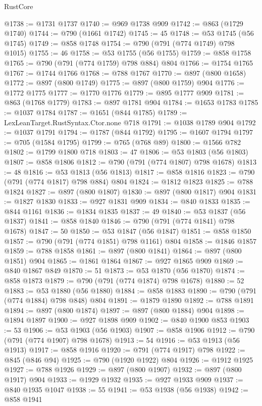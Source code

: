 \begin{lexlean}{RustCore}
\begin{coremodule}
@1738 := @1731 @1737
@1740 := @969 @1738 @909
@1742 := @863 (@1729 @1740)
@1744 := @790 (@1661 @1742)
@1745 := 45
@1748 := @53 @1745 (@56 @1745)
@1749 := @858 @1748
@1754 := @790 (@791 (@774 @1749) @798 @1015)
@1755 := 46
@1758 := @53 @1755 (@56 @1755)
@1759 := @858 @1758
@1765 := @790 (@791 (@774 @1759) @798 @884) @804
@1766 := @1754 @1765
@1767 := @1744 @1766
@1768 := @788 @1767
@1770 := @897 (@800 @1658)
@1772 := @897 (@800 @1749)
@1775 := @897 (@800 @1759) @904
@1776 := @1772 @1775
@1777 := @1770 @1776
@1779 := @895 @1777 @909
@1781 := @863 (@1768 @1779)
@1783 := @897 @1781 @904
@1784 := @1653 @1783
@1785 := @1037 @1784
@1787 := @1651 (@844 @1785)
@1789 := LexLeanTarget.RustSyntax.Ctor.none @718
@1791 := @1038 @1789 @904
@1792 := @1037 @1791
@1794 := @1787 (@844 @1792)
@1795 := @1607 @1794
@1797 := @705 (@1584 @1795)
@1799 := @765 (@768 @89)
@1800 := @1566 @782
@1802 := @1799 @1800 @718
@1803 := 47
@1806 := @53 @1803 (@56 @1803)
@1807 := @858 @1806
@1812 := @790 (@791 (@774 @1807) @798 @1678)
@1813 := 48
@1816 := @53 @1813 (@56 @1813)
@1817 := @858 @1816
@1823 := @790 (@791 (@774 @1817) @798 @884) @804
@1824 := @1812 @1823
@1825 := @788 @1824
@1827 := @897 (@800 @1807)
@1830 := @897 (@800 @1817) @904
@1831 := @1827 @1830
@1833 := @927 @1831 @909
@1834 := @840 @1833
@1835 := @844 @1161
@1836 := @1834 @1835
@1837 := 49
@1840 := @53 @1837 (@56 @1837)
@1841 := @858 @1840
@1846 := @790 (@791 (@774 @1841) @798 @1678)
@1847 := 50
@1850 := @53 @1847 (@56 @1847)
@1851 := @858 @1850
@1857 := @790 (@791 (@774 @1851) @798 @1161) @804
@1858 := @1846 @1857
@1859 := @788 @1858
@1861 := @897 (@800 @1841)
@1864 := @897 (@800 @1851) @904
@1865 := @1861 @1864
@1867 := @927 @1865 @909
@1869 := @840 @1867 @849
@1870 := 51
@1873 := @53 @1870 (@56 @1870)
@1874 := @858 @1873
@1879 := @790 (@791 (@774 @1874) @798 @1678)
@1880 := 52
@1883 := @53 @1880 (@56 @1880)
@1884 := @858 @1883
@1890 := @790 (@791 (@774 @1884) @798 @848) @804
@1891 := @1879 @1890
@1892 := @788 @1891
@1894 := @897 (@800 @1874)
@1897 := @897 (@800 @1884) @904
@1898 := @1894 @1897
@1900 := @927 @1898 @909
@1902 := @840 @1900 @853
@1903 := 53
@1906 := @53 @1903 (@56 @1903)
@1907 := @858 @1906
@1912 := @790 (@791 (@774 @1907) @798 @1678)
@1913 := 54
@1916 := @53 @1913 (@56 @1913)
@1917 := @858 @1916
@1920 := @791 (@774 @1917) @798
@1922 := @845 (@846 @94)
@1925 := @790 (@1920 @1922) @804
@1926 := @1912 @1925
@1927 := @788 @1926
@1929 := @897 (@800 @1907)
@1932 := @897 (@800 @1917) @904
@1933 := @1929 @1932
@1935 := @927 @1933 @909
@1937 := @840 @1935 @1047
@1938 := 55
@1941 := @53 @1938 (@56 @1938)
@1942 := @858 @1941

\end{coremodule}
\end{lexlean}
